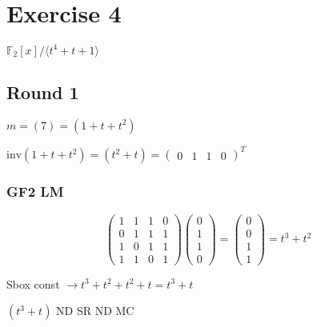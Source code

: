 \documentclass[a4paper]{scrreprt}
\newcommand\F{\mathbb F}
\begin{document}
\section*{Exercise 4}
$\F_2[x]/\langle t^4+t+1\rangle$
\subsection*{Round 1}
$m=(7)=(1+t+t^2)$

$\mathrm{inv}(1+t+t^2)=(t^2+t)=\begin{pmatrix}0&1&1&0\end{pmatrix}^T$

\subsubsection*{GF2 LM}
\[\begin{pmatrix}1&1&1&0\\0&1&1&1\\1&0&1&1\\1&1&0&1\end{pmatrix}
    \begin{pmatrix}0\\1\\1\\0\end{pmatrix}=\begin{pmatrix}0\\0\\1\\1\end{pmatrix}
        = t^3+t^2\]

Sbox const $\rightarrow t^3+t^2+t^2+t=t^3+t$

$(t^3+t)$ ND SR ND MC
\end{document}
